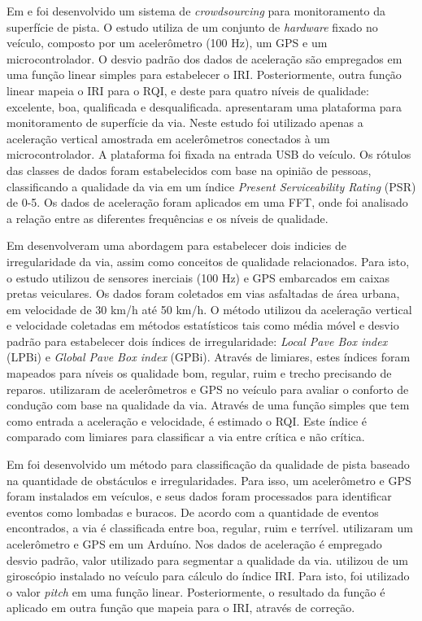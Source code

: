 Em \cite{Chen2013} e \cite{Chen2016} foi desenvolvido um sistema de \textit{crowdsourcing} para monitoramento da superfície de pista. O estudo utiliza de um conjunto de \textit{hardware} fixado no veículo, composto por um acelerômetro (100 Hz), um GPS e um microcontrolador. O desvio padrão dos dados de aceleração são empregados em uma função linear simples para estabelecer o IRI. Posteriormente, outra função linear mapeia o IRI para o RQI, e deste para quatro níveis de qualidade: excelente, boa, qualificada e desqualificada. \cite{Lei2018} apresentaram uma plataforma para monitoramento de superfície da via. Neste estudo foi utilizado apenas a aceleração vertical amostrada em acelerômetros conectados à um microcontrolador. A plataforma foi fixada na entrada USB do veículo. Os rótulos das classes de dados foram estabelecidos com base na opinião de pessoas, classificando a qualidade da via em um índice \textit{Present Serviceability Rating} (PSR) de 0-5. Os dados de aceleração foram aplicados em uma FFT, onde foi analisado a relação entre as diferentes frequências e os níveis de qualidade.

Em \cite{Monica2021} desenvolveram uma abordagem para estabelecer dois indicies de irregularidade da via, assim como conceitos de qualidade relacionados. Para isto, o estudo utilizou de sensores inerciais (100 Hz) e GPS embarcados em caixas pretas veiculares. Os dados foram coletados em vias asfaltadas de área urbana, em velocidade de 30 km/h até 50 km/h. O método utilizou da aceleração vertical e velocidade coletadas em métodos estatísticos tais como média móvel e desvio padrão para estabelecer dois índices de irregularidade: \textit{Local Pave Box index} (LPBi) e \textit{Global Pave Box index}  (GPBi). Através de limiares, estes índices foram mapeados para níveis os qualidade bom, regular, ruim e trecho precisando de reparos. \cite{Pont2017} utilizaram de acelerômetros e GPS no veículo para avaliar o conforto de condução com base na qualidade da via. Através de uma função simples que tem como entrada a aceleração e velocidade, é estimado o RQI. Este índice é comparado com limiares para classificar a via entre crítica e não crítica.

Em \cite{Hassan2019} foi desenvolvido um método para classificação da qualidade de pista baseado na quantidade de obstáculos e irregularidades. Para isso, um acelerômetro e GPS foram instalados em veículos, e seus dados foram processados para identificar eventos como lombadas e buracos. De acordo com a quantidade de eventos encontrados, a via é classificada entre boa, regular, ruim e terrível. \cite{Prapulla2017} utilizaram um acelerômetro e GPS em um Arduíno. Nos dados de aceleração é empregado desvio padrão, valor utilizado para segmentar a qualidade da via. \cite{Pitonak2016} utilizou de um giroscópio instalado no veículo para cálculo do índice IRI. Para isto, foi utilizado o valor \textit{pitch} em uma função linear. Posteriormente, o resultado da função é aplicado em outra função que mapeia para o IRI, através de correção.

